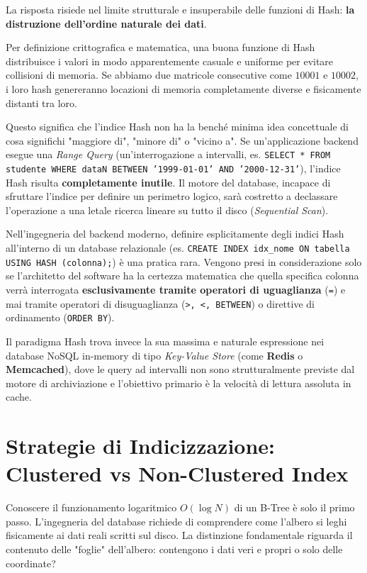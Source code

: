 La risposta risiede nel limite strutturale e insuperabile delle funzioni di Hash: \textbf{la distruzione dell'ordine naturale dei dati}.

Per definizione crittografica e matematica, una buona funzione di Hash distribuisce i valori in modo apparentemente casuale e uniforme per evitare collisioni di memoria. Se abbiamo due matricole consecutive come $10001$ e $10002$, i loro hash genereranno locazioni di memoria completamente diverse e fisicamente distanti tra loro.

Questo significa che l'indice Hash non ha la benché minima idea concettuale di cosa significhi "maggiore di", "minore di" o "vicino a". Se un'applicazione backend esegue una \textit{Range Query} (un'interrogazione a intervalli, es. \texttt{SELECT * FROM studente WHERE dataN BETWEEN '1999-01-01' AND '2000-12-31'}), l'indice Hash risulta \textbf{completamente inutile}. Il motore del database, incapace di sfruttare l'indice per definire un perimetro logico, sarà costretto a declassare l'operazione a una letale ricerca lineare su tutto il disco (\textit{Sequential Scan}).

Nell'ingegneria del backend moderno, definire esplicitamente degli indici Hash all'interno di un database relazionale (es. \texttt{CREATE INDEX idx\_nome ON tabella USING HASH (colonna);}) è una pratica rara. Vengono presi in considerazione solo se l'architetto del software ha la certezza matematica che quella specifica colonna verrà interrogata \textbf{esclusivamente tramite operatori di uguaglianza} (\texttt{=}) e mai tramite operatori di disuguaglianza (\texttt{>, <, BETWEEN}) o direttive di ordinamento (\texttt{ORDER BY}). 

Il paradigma Hash trova invece la sua massima e naturale espressione nei database NoSQL in-memory di tipo \textit{Key-Value Store} (come \textbf{Redis} o \textbf{Memcached}), dove le query ad intervalli non sono strutturalmente previste dal motore di archiviazione e l'obiettivo primario è la velocità di lettura assoluta in cache.

\section{Strategie di Indicizzazione: Clustered vs Non-Clustered Index}

Conoscere il funzionamento logaritmico $O(\log N)$ di un B-Tree è solo il primo passo. L'ingegneria del database richiede di comprendere come l'albero si leghi fisicamente ai dati reali scritti sul disco. La distinzione fondamentale riguarda il contenuto delle "foglie" dell'albero: contengono i dati veri e propri o solo delle coordinate?


